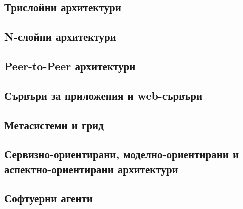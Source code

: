 \documentclass[fleqn,12pt]{article}
\begin{document}
\subsection{Трислойни архитектури}
\subsection{N-слойни архитектури}
\subsection{Peer-to-Peer архитектури}
\subsection{Сървъри за приложения и web-сървъри}
\subsection{Метасистеми и грид}
\subsection{Сервизно-ориентирани, моделно-ориентирани и аспектно-ориентирани архитектури}
\subsection{Софтуерни агенти}
\end{document}
